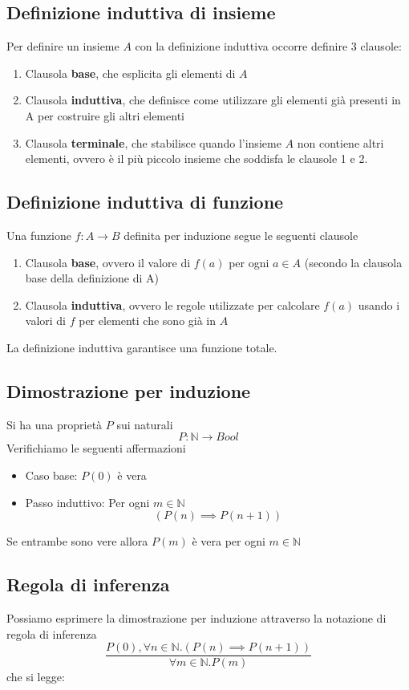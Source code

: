 \documentclass{article}
\begin{document}
\subsection*{Definizione induttiva di insieme}
Per definire un insieme \(A\) con la definizione induttiva occorre definire 3 clausole:
\begin{enumerate}
    \item Clausola \textbf{base}, che esplicita gli elementi di \(A\)
    \item Clausola \textbf{induttiva}, che definisce come utilizzare gli elementi già presenti in A per costruire gli altri elementi
    \item Clausola \textbf{terminale}, che stabilisce quando l'insieme \(A\) non contiene altri elementi, ovvero è il più piccolo insieme che soddisfa le clausole 1 e 2.
\end{enumerate}
\subsection*{Definizione induttiva di funzione}
Una funzione \(f: A \rightarrow B\) definita per induzione segue le seguenti clausole
\begin{enumerate}
    \item Clausola \textbf{base}, ovvero il valore di \(f(a)\) per ogni \(a \in A\) (secondo la clausola base della definizione di A)
    \item Clausola \textbf{induttiva}, ovvero le regole utilizzate per calcolare \(f(a)\) usando i valori di \(f\) per elementi che sono già in \(A\)
\end{enumerate}
La definizione induttiva garantisce una funzione totale.
\subsection*{Dimostrazione per induzione}
Si ha una proprietà \(P\) sui naturali
\[P: \mathbb{N} \rightarrow Bool\]
Verifichiamo le seguenti affermazioni
\begin{itemize}
    \item Caso base: \(P(0)\) è vera
    \item Passo induttivo: Per ogni \(m \in \mathbb{N}\)
          \[\left(P(n) \implies P(n + 1)\right)\]
\end{itemize}
Se entrambe sono vere allora \(P(m)\) è vera per ogni \(m \in \mathbb{N}\)
\subsection*{Regola di inferenza}
Possiamo esprimere la dimostrazione per induzione attraverso la notazione di regola di inferenza
\[\frac{
        P(0), \forall n \in \mathbb{N} . \left(P(n) \implies P(n + 1)\right)
    }{
        \forall m \in \mathbb{N} . P(m)
    }
\]
che si legge: 
\end{document}
